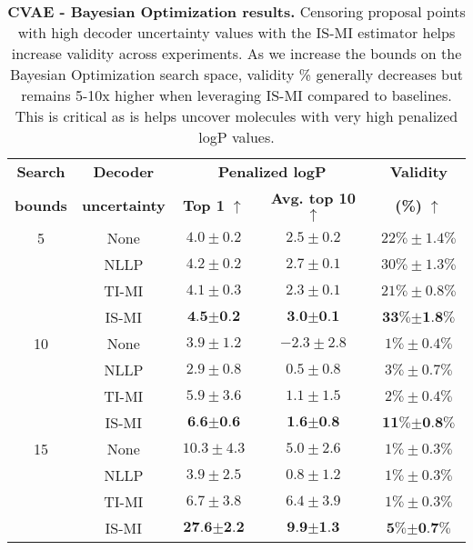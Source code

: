 \begin{table}
\begin{center}
\vspace*{-1mm}
\caption{\textbf{CVAE - Bayesian Optimization results.} Censoring proposal points with high decoder uncertainty values with the IS-MI estimator helps increase validity across experiments. As we increase the bounds on the Bayesian Optimization search space, validity \% generally decreases but remains 5-10x higher when leveraging IS-MI compared to baselines. This is critical as is helps uncover molecules with very high penalized logP values.}
\begin{tabular}{ccccc}
\toprule
\textbf{Search}  & \textbf{Decoder} &  \multicolumn{2}{c}{\textbf{Penalized logP}} & \textbf{Validity}\\
\textbf{bounds} & \textbf{uncertainty} & \textbf{Top 1} $\uparrow$ & \textbf{Avg. top 10} $\uparrow$ & \textbf{(\%)} $\uparrow$ \\
\toprule
5  & None  & $4.0  \pm 0.2$& $2.5  \pm 0.2$& $22\% \pm 1.4\%$\\
   & NLLP  & $4.2  \pm 0.2$& $2.7  \pm 0.1$& $30\% \pm 1.3\%$\\
   & TI-MI & $4.1  \pm 0.3$& $2.3  \pm 0.1$& $21\% \pm 0.8\%$\\
   & IS-MI & $\textbf{4.5}  \pm \textbf{0.2}$& $\textbf{3.0}  \pm \textbf{0.1}$& $\textbf{33\%} \pm \textbf{1.8\%}$\\ 
\midrule
10 & None  & $3.9  \pm 1.2$& $-2.3 \pm 2.8$& $1\%  \pm 0.4\%$\\
   & NLLP  & $2.9  \pm 0.8$& $0.5  \pm 0.8$& $3\%  \pm 0.7\%$\\
   & TI-MI & $5.9  \pm 3.6$& $1.1  \pm 1.5$& $2\%  \pm 0.4\%$\\
   & IS-MI & $\textbf{6.6} \pm \textbf{0.6} $& $\textbf{1.6} \pm \textbf{0.8}$&$ \textbf{11\%} \pm \textbf{0.8\%}$\\ 
\midrule
15 & None  & $10.3 \pm 4.3$& $5.0  \pm 2.6$& $1\%  \pm 0.3\%$\\
   & NLLP  & $3.9  \pm 2.5$& $0.8  \pm 1.2$& $1\%  \pm 0.3\%$\\
   & TI-MI & $6.7  \pm 3.8$& $6.4  \pm 3.9$& $1\%  \pm 0.3\%$\\
   & IS-MI & $\textbf{27.6} \pm \textbf{2.2}$& $\textbf{9.9} \pm \textbf{1.3} $& $\textbf{5\%} \pm \textbf{0.7\%}$\\
\bottomrule
\end{tabular}
\label{Table_CVAE_BO_results}
\end{center}
\vspace{-2mm}
\end{table}